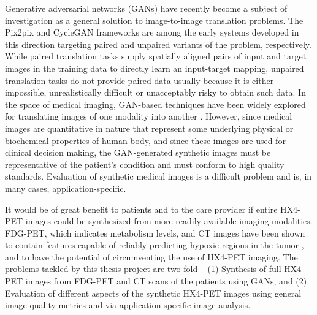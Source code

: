 Generative adversarial networks (GANs) have recently become a subject of investigation as a general solution to image-to-image translation problems. The Pix2pix and CycleGAN frameworks \cite{isola2017image, zhu2017unpaired} are among the early systems developed in this direction targeting paired and unpaired variants of the problem, respectively. While paired translation tasks supply spatially aligned pairs of input and target images in the training data to directly learn an input-target mapping, unpaired translation tasks do not provide paired data usually because it is either impossible, unrealistically difficult or unacceptably risky to obtain such data. In the space of medical imaging, GAN-based techniques have been widely explored for translating images of one modality into another \cite{yi2019generative}. However, since medical images are quantitative in nature that represent some underlying physical or biochemical properties of human body, and since these images are used for clinical decision making, the GAN-generated synthetic images must be representative of the patient's condition and must conform to high quality standards. Evaluation of synthetic medical images is a difficult problem and is, in many cases, application-specific. 

It would be of great benefit to patients and to the care provider if entire HX4-PET images could be synthesized from more readily available imaging modalities. FDG-PET, which indicates metabolism levels, and CT images have been shown to contain features capable of reliably predicting hypoxic regions in the tumor \cite{even2017predicting, sanduleanu2020non}, and to have the potential of circumventing the use of HX4-PET imaging. The problems tackled by this thesis project are two-fold -- (1) Synthesis of full HX4-PET images from FDG-PET and CT scans of the patients using GANs, and (2) Evaluation of different aspects of the synthetic HX4-PET images using general image quality metrics and via application-specific image analysis.



